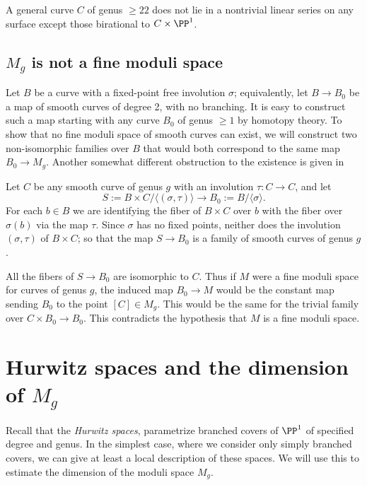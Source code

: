 \begin{fact}
 A general curve $C$ of  genus $\geq 22$ does not lie in a nontrivial linear series on any surface
 except those birational to $C\times \PP^1$.
\end{fact}


\subsection{$M_g$ is not a fine moduli space}\label{coarse moduli}

Let $B$ be a curve with a fixed-point free involution $\sigma$; equivalently, let $B \to B_0$ be a map of smooth curves of degree 2, with no branching. It is easy to construct such a map starting with any curve $B_0$ of genus $\geq 1$ by homotopy theory. 
To show that no fine moduli space of smooth curves can exist, we will construct two non-isomorphic families over $B$ that
would both correspond to the same map $B_0\to M_g$. Another somewhat different obstruction to the existence is given in 
\cite[Chapter 6]{DE-JH-schemes}

Let $C$ be any smooth curve of genus $g$ with an involution $\tau : C \to C$, and let 
$$
S := B \times C/\langle (\sigma, \tau) \rangle \to B_0 := B/\langle \sigma \rangle.
$$
For each $b \in B$ we are identifying the fiber of $B \times C$ over $b$ with the fiber over $\sigma(b)$ via the map $\tau$. Since $\sigma$ has no fixed points, neither does the involution $(\sigma, \tau)$ of $B \times C$; so that the map $S \to B_0$ is a family of smooth curves of genus $g$.

All the fibers of $S \to B_0$ are isomorphic to $C$. Thus if $M$ were a fine moduli space for curves of genus $g$,
 the induced map $B_0 \to M$ would be the constant map sending $B_0$ to the point $[C] \in M_g$. This would be the
 same for the trivial family over $C\times B_0 \to B_0$. This contradicts the hypothesis that $M$ is a fine moduli space. 


\section{Hurwitz spaces and the dimension of $M_g$}\label{Hurwitz section}

Recall that the \emph{Hurwitz spaces},  parametrize branched covers of $\PP^1$ of specified degree and genus. In the simplest case, where we consider only simply branched covers, we can give at least a local description of these spaces. We will use this to estimate the dimension of the moduli space $M_g$.

